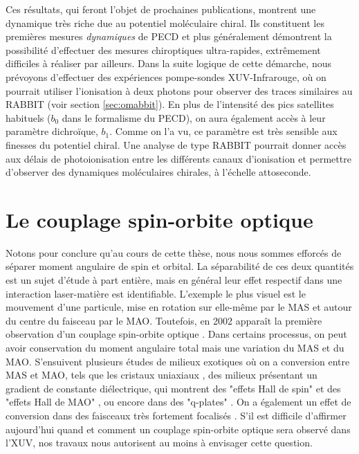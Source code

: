 Ces résultats, qui feront l'objet de prochaines publications, montrent une dynamique très riche due au potentiel moléculaire chiral. Ils constituent les premières mesures \textit{dynamiques} de PECD et plus généralement démontrent la possibilité d'effectuer des mesures chiroptiques ultra-rapides, extrêmement difficiles à réaliser par ailleurs. Dans la suite logique de cette démarche, nous prévoyons d'effectuer des expériences pompe-sondes XUV-Infrarouge, où on pourrait utiliser l'ionisation à deux photons pour observer des traces similaires au RABBIT (voir section \ref{sec:omabbit}). En plus de l'intensité des pics satellites habituels ($b_0$ dans le formalisme du PECD), on aura également accès à leur paramètre dichroïque, $b_1$. Comme on l'a vu, ce paramètre est très sensible aux finesses du potentiel chiral. Une analyse de type RABBIT pourrait donner accès aux délais de photoionisation entre les différents canaux d'ionisation et permettre d'observer des dynamiques moléculaires chirales, à l'échelle attoseconde. 

\section{Le couplage spin-orbite optique}
Notons pour conclure qu'au cours de cette thèse, nous nous sommes efforcés de séparer moment angulaire de spin et orbital. La séparabilité de ces deux quantités est un sujet d'étude à part entière, mais en général leur effet respectif dans une interaction laser-matière est identifiable. L'exemple le plus visuel est le mouvement d'une particule, mise en rotation sur elle-même par le MAS et autour du centre du faisceau par le MAO. Toutefois, en 2002 apparaît la première observation d'un couplage spin-orbite optique . Dans certains processus, on peut avoir conservation du moment angulaire total mais une variation du MAS et du MAO. S'ensuivent plusieurs études de milieux exotiques où on a conversion entre MAS et MAO, tels que les cristaux uniaxiaux , des milieux présentant un gradient de constante diélectrique, qui montrent des "effets Hall de spin"  et des "effets Hall de MAO" , ou encore dans des "q-plates" . On a également un effet de conversion dans des faisceaux très fortement focalisés . S'il est difficile d'affirmer aujourd'hui quand et comment un couplage spin-orbite optique sera observé dans l'XUV, nos travaux nous autorisent au moins à envisager cette question. 

